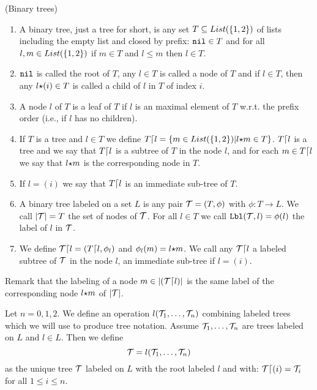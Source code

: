 \begin{definition}(Binary trees)
\begin{enumerate}
\item 
A binary tree, just a tree for short, is any set $T\subseteq {\relax List}(\{1,2\})$ 
of lists including the empty list and closed by prefix: ${\tt nil} \in T$ and for all $l, m \in {\relax List}(\{1,2\})$
if $m \in T$ and $l \le m$ then $l \in T$. 

\item
${\tt nil}$ is called the root of $T$, any $l \in T$ is called a node of
$T$ and if $l \in T$, then any $l {\star} (i) \in T$ is called a child of $l$ in $T$
of index $i$.

\item
A node $l$ of $T$ is a leaf of $T$ if $l$ is an maximal element of $T$ w.r.t. the prefix order (i.e.,
if $l$ has no children). 

\item
If $T$ is a tree and $l \in T$ we define $T {\lceil} l = \{m \in {\relax List}(\{1,2\}) | l {\star} m \in T\}$.
$T {\lceil} l$ is a tree and we say that $T {\lceil} l$ is a subtree of $T$ in the node $l$,
and for each $m \in T {\lceil} l$ we say that $l {\star} m$ is the corresponding node in $T$.
\item

If $l=(i)$ we say that $T {\lceil} l$ is an immediate sub-tree of $T$.
\item
A binary tree labeled on a set $L$ is any pair ${\mathcal T} = (T, \phi)$ with 
$\phi:T \rightarrow L$. We call ${|{\mathcal T}|}=T$ the set of nodes of ${\mathcal T}$.
For all $l \in T$ we call ${\tt Lbl}({\mathcal T},l) = \phi(l)$ the label of $l$ in ${\mathcal T}$.
\item
We define ${\mathcal T} {\lceil} l = (T {\lceil} l, \phi_l)$ and $\phi_l(m) = l {\star} m$. 
We call any ${\mathcal T} {\lceil} l$ a labeled subtree of ${\mathcal T}$
in the node $l$, an immediate sub-tree if $l=(i)$. 
\end{enumerate}
\end{definition}

Remark that the labeling of a node $m \in {|( {\mathcal T}{\lceil}l )|}$ 
is the same label of the corresponding node $l {\star} m$ of ${|{\mathcal T}|}$.
 
Let $n = 0, 1, 2$. We define an operation $l({\mathcal T}_1, \ldots, {\mathcal T}_n)$
combining labeled trees which we will use to produce tree notation. 
Assume ${\mathcal T}_1, \ldots,{\mathcal T}_n$ are trees labeled on $L$ and $l \in L$.
Then we define $${\mathcal T} = l({\mathcal T}_1, \ldots, {\mathcal T}_n)$$ 
as the unique tree ${\mathcal T}$ labeled on $L$ with the root labeled $l$ and with:
${\mathcal T} {\lceil} (i) = {\mathcal T}_i$ for all $1 \le i \le n$.


